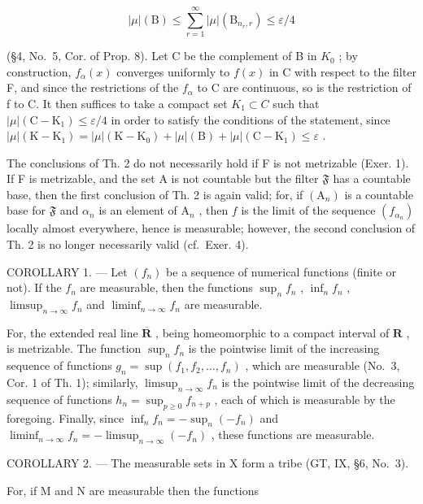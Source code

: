 \[
| \mu | (\mathrm{B}) \leqslant \sum_ {r = 1} ^ {\infty} | \mu | (\mathrm{B} _ {n _ {r}, r}) \leqslant \varepsilon / 4
\]

(§4, No.~5, Cor. of Prop. 8). Let C be the complement of B in \(K_{0}\) ; by construction, \(f_{\alpha}(x)\) converges uniformly to \(f(x)\) in C with respect to the filter F, and since the restrictions of the \(f_{\alpha}\) to C are continuous, so is the restriction of f to C. It then suffices to take a compact set \(K_{1} \subset C\) such that \(|\mu|(\mathrm{C} - \mathrm{K}_{1}) \leqslant \varepsilon/4\) in order to satisfy the conditions of the statement, since \(|\mu|(\mathrm{K} - \mathrm{K}_{1}) = |\mu|(\mathrm{K} - \mathrm{K}_{0}) + |\mu|(\mathrm{B}) + |\mu|(\mathrm{C} - \mathrm{K}_{1}) \leqslant \varepsilon\) .

The conclusions of Th. 2 do not necessarily hold if F is not metrizable (Exer. 1). If F is metrizable, and the set A is not countable but the filter \(\mathfrak{F}\) has a countable base, then the first conclusion of Th. 2 is again valid; for, if \((\mathrm{A}_n)\) is a countable base for \(\mathfrak{F}\) and \(\alpha_{n}\) is an element of \(\mathrm{A}_n\) , then \(f\) is the limit of the sequence \((f_{\alpha_n})\) locally almost everywhere, hence is measurable; however, the second conclusion of Th. 2 is no longer necessarily valid (cf.~Exer. 4).

COROLLARY 1. --- Let \((f_n)\) be a sequence of numerical functions (finite or not). If the \(f_n\) are measurable, then the functions \(\sup_{n} f_n\) , \(\inf_{n} f_n\) , \(\limsup_{n \to \infty} f_n\) and \(\liminf_{n \to \infty} f_n\) are measurable.

For, the extended real line \(\overline{\mathbf{R}}\) , being homeomorphic to a compact interval of \(\mathbf{R}\) , is metrizable. The function \(\sup_{n} f_n\) is the pointwise limit of the increasing sequence of functions \(g_n = \sup(f_1, f_2, \ldots, f_n)\) , which are measurable (No.~3, Cor. 1 of Th. 1); similarly, \(\limsup_{n \to \infty} f_n\) is the pointwise limit of the decreasing sequence of functions \(h_n = \sup_{p \geqslant 0} f_{n+p}\) , each of which is measurable by the foregoing. Finally, since \(\inf_{n} f_n = -\sup_{n} (-f_n)\) and \(\liminf_{n \to \infty} f_n = -\limsup_{n \to \infty} (-f_n)\) , these functions are measurable.

COROLLARY 2. --- The measurable sets in X form a tribe (GT, IX, §6, No.~3).

For, if M and N are measurable then the functions

